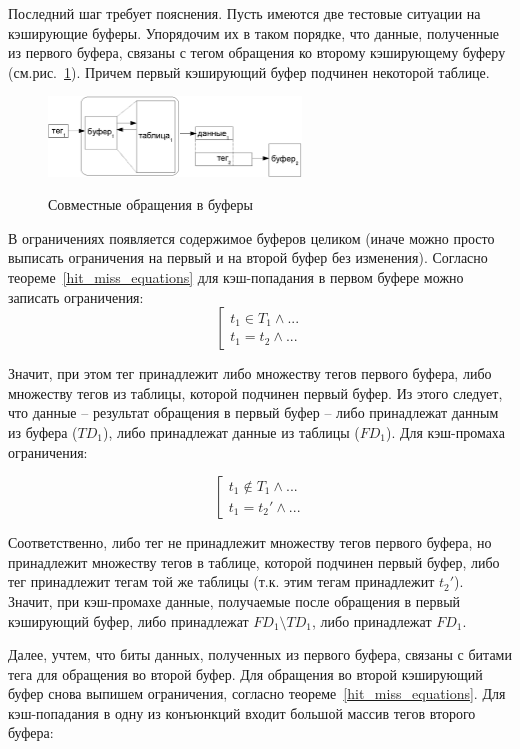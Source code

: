 Последний шаг требует пояснения. Пусть имеются две тестовые ситуации
на кэширующие буферы. Упорядочим их в таком порядке, что данные,
полученные из первого буфера, связаны с тегом обращения ко второму
кэширующему буферу (см.рис.~\ref{conjunctive}). Причем первый
кэширующий буфер подчинен некоторой таблице.

\begin{figure}[h] \center
  \includegraphics[width=0.6\textwidth]{2.theor/conjunctive}\\
  \caption{Совместные обращения в буферы}\label{conjunctive}
\end{figure}

В ограничениях появляется содержимое буферов целиком (иначе можно
просто выписать ограничения на первый и на второй буфер без
изменения). Согласно теореме~\ref{hit_miss_equations} для
кэш-попадания в первом буфере можно записать ограничения:
$$
\left[\begin{array}{l} t_1 \in T_1 \wedge \mbox{...}\\
t_1 = t_2 \wedge \mbox{...}
\end{array}\right.
$$

Значит, при этом тег принадлежит либо множеству тегов первого
буфера, либо множеству тегов из таблицы, которой подчинен первый
буфер. Из этого следует, что данные -- результат обращения в первый
буфер -- либо принадлежат данным из буфера ($TD_1$), либо
принадлежат данные из таблицы ($FD_1$). Для кэш-промаха ограничения:

$$
\left[\begin{array}{l} t_1 \notin T_1 \wedge \mbox{...}\\
t_1 = t_2' \wedge \mbox{...}
\end{array}\right.
$$

Соответственно, либо тег не принадлежит множеству тегов первого
буфера, но принадлежит множеству тегов в таблице, которой подчинен
первый буфер, либо тег принадлежит тегам той же таблицы (т.к. этим
тегам принадлежит $t_2'$). Значит, при кэш-промахе данные,
получаемые после обращения в первый кэширующий буфер, либо
принадлежат $FD_1 \setminus TD_1$, либо принадлежат $FD_1$.

Далее, учтем, что биты данных, полученных из первого буфера, связаны
с битами тега для обращения во второй буфер. Для обращения во второй
кэширующий буфер снова выпишем ограничения, согласно
теореме~\ref{hit_miss_equations}. Для кэш-попадания в одну из
конъюнкций входит большой массив тегов второго буфера:


